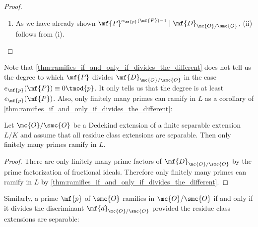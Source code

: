 \begin{proof}
\begin{enumerate}[label*=(\roman*)]
        \[
          \Trace_{(\mc{O}/\mf{P}^{e_{\mf{p}}(\mf{P})})/\F_{\mf{p}}}(\conj{\b}) = e_{\mf{p}}(\mf{P})\Trace_{\F_{\mf{P}}/\F_{\mf{p}}}(\conj{\b}),
        \]
        which we recall is an element of \(\F_{\mf{p}}\). As the residue class extensions are assumed to be separable, \cref{lem:trace_is_nondegenerate} implies that \(\Trace_{\F_{\mf{P}}/\F_{\mf{p}}}(\conj{\b})\) cannot be zero for all \(\b \in \mc{O}\). So it must be the case that \(\Trace_{(\mc{O}/\mf{P}^{e_{\mf{p}}(\mf{P})})/\F_{\mf{p}}}(\conj{\b}) = 0\) for all \(\b \in \mc{O}\) if and only if \(e_{\mf{p}}(\mf{P}) \equiv 0 \tmod{\mf{p}}\). This proves (i).
        \item As we have already shown \(\mf{P}^{e_{\mf{p}}(\mf{P})-1} \mid \mf{D}_{\mc{O}/\smc{O}}\), (ii) follows from (i).
      \end{enumerate}
    \end{proof}

    Note that \cref{thm:ramifies_if_and_only_if_divides_the_different} does not tell us the degree to which \(\mf{P}\) divides \(\mf{D}_{\mc{O}/\smc{O}}\) in the case \(e_{\mf{p}}(\mf{P}) \equiv 0 \tmod{p}\). It only tells us that the degree is at least \(e_{\mf{p}}(\mf{P})\). Also, only finitely many primes can ramify in \(L\) as a corollary of \cref{thm:ramifies_if_and_only_if_divides_the_different}:

    \begin{corollary}\label{cor:finitely_many_primes_ramify_L}
      Let \(\mc{O}/\smc{O}\) be a Dedekind extension of a finite separable extension \(L/K\) and assume that all residue class extensions are separable. Then only finitely many primes ramify in \(L\).
    \end{corollary}
    \begin{proof}
      There are only finitely many prime factors of \(\mf{D}_{\mc{O}/\smc{O}}\) by the prime factorization of fractional ideals. Therefore only finitely many primes can ramify in \(L\) by \cref{thm:ramifies_if_and_only_if_divides_the_different}.
    \end{proof}

    Similarly, a prime \(\mf{p}\) of \(\smc{O}\) ramifies in \(\mc{O}/\smc{O}\) if and only if it divides the discriminant \(\mf{d}_{\mc{O}/\smc{O}}\) provided the residue class extensions are separable:

